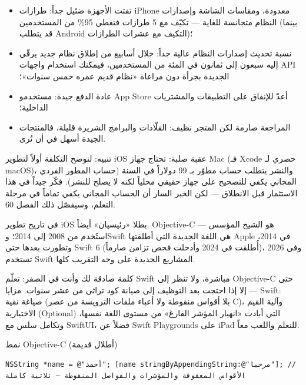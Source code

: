 \begin{itemize}
  \item تفتت الأجهزة ضئيل جداً: طرازات iPhone معدودة، ومقاسات الشاشة وإصدارات النظام متجانسة للغاية — تكيّف مع 5 طرازات فتغطي 95\% من المستخدمين (بينما قد يتطلب Android التكيف مع عشرات الطرازات)؛
  \item نسبة تحديث إصدارات النظام عالية جداً: خلال أسابيع من إطلاق نظام جديد يرقّي إليه سبعون إلى ثمانون في المئة من المستخدمين، فيمكنك استخدام واجهات API الجديدة بجرأة دون مراعاة «نظام قديم عمره خمس سنوات»؛
  \item عادة الدفع جيدة: مستخدمو App Store أعدّ للإنفاق على التطبيقات والمشتريات الداخلية؛
  \item المراجعة صارمة لكن المتجر نظيف: القلّادات والبرامج الشريرة قليلة، فالمنتجات الجيدة أسهل في أن تُرى.
\end{itemize}

\begin{tcbwarn}{تنبيه: لنوضح التكلفة أولاً}
لتطوير iOS عقبة صلبة: تحتاج جهاز Mac (فـ Xcode حصري لـ macOS)، والنشر يتطلب حساب مطوّر بـ 99 دولاراً في السنة (حساب المطور الفردي المجاني يكفي للتصحيح على جهاز حقيقي محلياً لكنه لا يصلح للنشر). فكّر جيداً في هذا الاستثمار قبل الانطلاق — لكن الخبر السار أن الحساب المجاني يكفي تماماً في مرحلة التعلم، وسيفصّل ذلك الفصل 60.

\end{tcbwarn}


في تاريخ تطوير iOS بطلا «رئيسيان» أيضاً. Objective-C هو الشيخ المؤسس — استُخدم من 2008 إلى 2014؛ وSwift هي اللغة الجديدة التي أطلقتها Apple في 2014، وتطورت بعدها حتى Swift 6 (أُطلقت في 2024 وأدخلت فحص تزامن صارماً)، وفي 2026 تستخدم Swift المشاريع الجديدة على وجه التقريب كلها.

كلمة صادقة لك وأنت في الصفر: تعلّم Swift مباشرة، ولا تنظر إلى Objective-C حتى — إلا إذا احتجت بعد التوظيف إلى صيانة كود تراثي من عشر سنوات. مزايا Swift: صياغة نقية (بلا أقواس منقوطة ولا أعباء ملفات الترويسة من عصر C)، وآلية القيم الاختيارية (Optional) التي أبادت «انهيار المؤشر الفارغ» من مستوى اللغة نفسها، وتكامل سلس مع SwiftUI، فضلاً عن Swift Playgrounds على iPad للتعلم واللعب معاً.

نمط Objective-C (أطلال قديمة)

\begin{lstlisting}
NSString *name = @"أحمد"; [name stringByAppendingString:@"مرحبا"]; // الأقواس المعقوفة والمؤشرات والفواصل المنقوطة — ثلاثية كاملة
\end{lstlisting}

